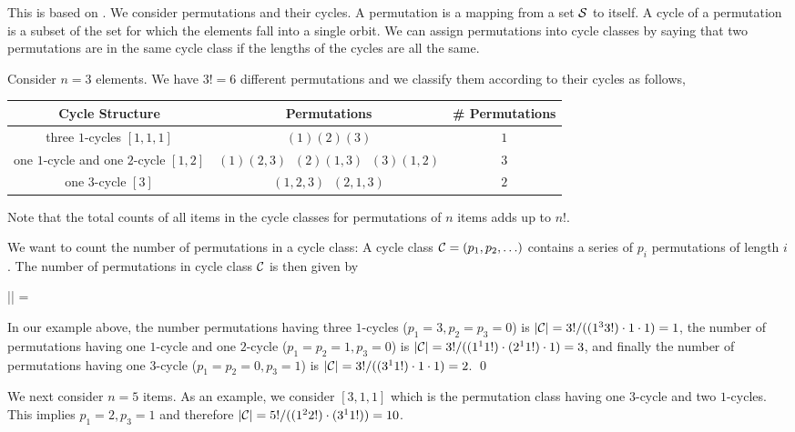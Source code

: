 
This is based on \cite{Dominus2007}. We consider permutations and their cycles. A permutation is a mapping from a set $\mathcal{S}$ to itself. A cycle of a permutation is a subset of the set for which the elements fall into a single orbit. We can assign permutations into cycle classes by saying that two permutations are in the same cycle class if the lengths of the cycles are all the same.

Consider $n = 3$ elements. We have $3! = 6$ different permutations and we classify them according to their cycles as follows,

\vspace{2mm}

\begin{tabular}{|c|c|c|}
  Cycle Structure & Permutations & \# Permutations \\ \hline
  three $1$-cycles $[1,1,1] $ & $(1)(2)(3)$ & $1$ \\
  one $1$-cycle and one $2$-cycle $[1,2]$ & $(1)(2,3) \;\; (2)(1,3) \;\; (3)(1,2)$ & $3$ \\
  one $3$-cycle $[3]$ & $(1,2,3) \;\; (2,1,3)$ & $2$
\end{tabular}

\vspace{2mm}

Note that the total counts of all items in the cycle classes for permutations of $n$ items adds up to $n!$.

We want to count the number of permutations in a cycle class: A cycle class $\mathcal{C}=(p_1, p_2, \ldots)$ contains a series of $p_i$ permutations of length $i$. The number of permutations in cycle class $\mathcal{C}$ is then given by

\bee
|\Cc| = 
\eee

In our example above, the number permutations having three $1$-cycles ($p_1 = 3, p_2=p_3=0$) is $|\mathcal{C}| = 3! / ((1^3 3!) \cdot 1 \cdot 1) = 1$, the number of permutations having one $1$-cycle and one $2$-cycle ($p_1 = p_2 = 1, p_3=0$) is $|\mathcal{C}| = 3! / ((1^1 1!) \cdot (2^1 1!) \cdot 1) = 3$, and finally the number of permutations having one $3$-cycle ($p_1=p_2=0, p_3 = 1$) is $|\mathcal{C}| = 3! / ((3^1 1!) \cdot 1 \cdot 1) = 2$. \qed

We next consider $n=5$ items. As an example, we consider $[3,1,1]$ which is the permutation class having one $3$-cycle and two $1$-cycles. This implies $p_1=2, p_3=1$ and therefore $|\mathcal{C}| = 5! / ((1^2 2!) \cdot (3^1 1!)) = 10$. 

